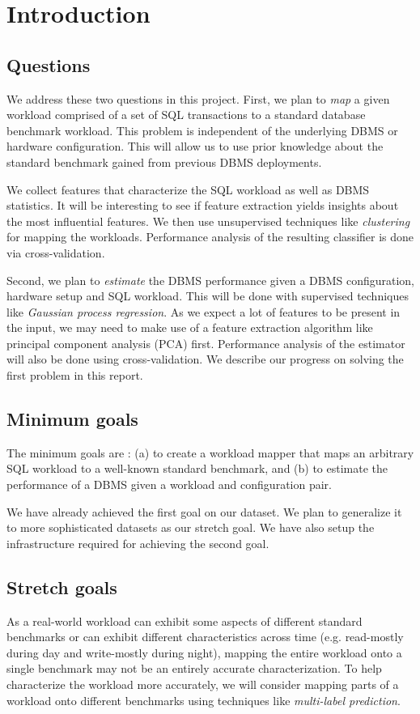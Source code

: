 \section{Introduction} \label{sec:intro}


\subsection{Questions}

We address these two questions in this project.
First, we plan to \textit{map} a given workload comprised of
a set of SQL transactions to a standard database benchmark workload. 
This problem is independent of the underlying DBMS or hardware configuration.
This will allow us to use prior knowledge about the standard 
benchmark gained from previous DBMS deployments. 

We collect features that characterize the SQL workload as well as 
DBMS statistics.
It will be interesting to see if feature extraction yields insights
about the most influential features.
We then use unsupervised techniques like \textit{clustering} 
for mapping the workloads.
Performance analysis of the resulting classifier is done via
cross-validation.

Second, we plan to \textit{estimate} the DBMS performance given a 
DBMS configuration, hardware setup and SQL workload. 
This will be done with supervised techniques like 
\textit{Gaussian process regression}.
As we expect a lot of features to be present in the input, we may
need to make use of a feature extraction algorithm like
principal component analysis (PCA) first.
Performance analysis of the estimator will also be done using 
cross-validation.
We describe our progress on solving the first problem in this report.

\subsection{Minimum goals}
The minimum goals are : (a) to create a workload mapper that maps an arbitrary
SQL workload to a well-known standard benchmark, and (b) to estimate the
performance of a DBMS given a workload and configuration pair.

We have already achieved the first goal on our dataset. We plan to
generalize it to more sophisticated datasets as our stretch goal. 
We have also setup the infrastructure required 
for achieving the second goal.

\subsection{Stretch goals}
As a real-world workload can exhibit some aspects of different standard
benchmarks or can exhibit different characteristics across time (e.g. read-mostly
during day and write-mostly during night), mapping the entire workload onto
a single benchmark may not be an entirely accurate characterization.
To help characterize the workload more accurately, we will consider mapping
parts of a workload onto different benchmarks using techniques like
\textit{multi-label prediction}.

